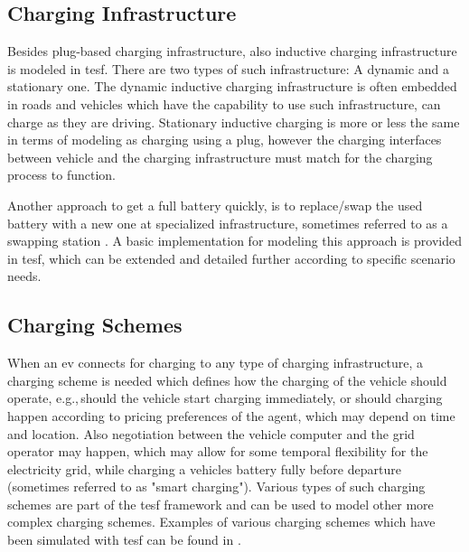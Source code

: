 \subsection{Charging Infrastructure}
Besides plug-based charging infrastructure, also inductive charging infrastructure is modeled in \gls{tesf}. There are two types of such infrastructure: A dynamic and a stationary one. The dynamic inductive charging infrastructure is often embedded in roads and vehicles which have the capability to use such infrastructure, can charge as they are driving. Stationary inductive charging is more or less the same in terms of modeling as charging using a plug, however the charging interfaces between vehicle and the charging infrastructure must match for the charging process to function.

Another approach to get a full battery quickly, is to replace/swap the used battery with a new one at specialized infrastructure, sometimes referred to as a swapping station \citep[][]{LiEtAl_ACC_2011}. A basic implementation for modeling this approach is provided in \gls{tesf}, which can be extended and detailed further according to specific scenario needs.

\subsection{Charging Schemes}
When an \gls{ev} connects for charging to any type of charging infrastructure, a charging scheme is needed which defines how the charging of the vehicle should operate, e.g.,\,should the vehicle start charging immediately, or should charging happen according to pricing preferences of the agent, which may depend on time and location. Also negotiation between the vehicle computer and the grid operator may happen, which may allow for some temporal flexibility for the electricity grid, while charging a vehicles battery fully before departure (sometimes referred to as "smart charging"). Various types of such charging schemes are part of the \gls{tesf} framework and can be used to model other more complex charging schemes. Examples of various charging schemes which have been simulated with \gls{tesf} can be found in \citet[][]{WaraichEtAl_TRR_2013}.

